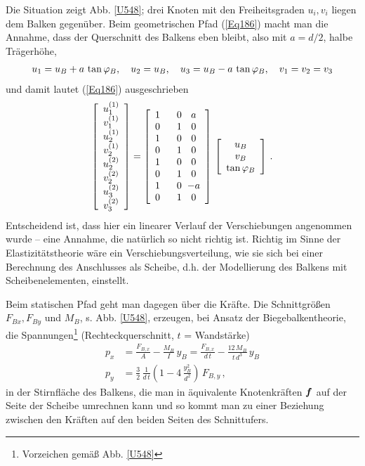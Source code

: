 Die Situation zeigt Abb. \ref{U548}; drei Knoten mit den Freiheitsgraden  $u_i, v_i$ liegen dem Balken gegen\"{u}ber. Beim geometrischen Pfad (\ref{Eq186}) macht man die Annahme, dass der Querschnitt des Balkens eben bleibt, also mit $a = d/2$, halbe Tr\"{a}gerh\"{o}he,
\begin{align}
u_1 = u_B + a\,\tan \varphi_B, \quad u_2 = u_B, \quad u_3 = u_B - a\,\tan \varphi_B, \quad v_1 = v_2 = v_3
\end{align}
und damit lautet (\ref{Eq186}) ausgeschrieben
\begin{align}
\left[\barr{c} u_1^{(1)} \\ v_1^{(1)}  \\u_2^{(1)} \\ v_2^{(1)} \\ u_2^{(2)} \\ v_2^{(2)} \\ u_3^{(2) } \\ v_3^{(2)}\earr \right] = \left[\barr{c @{\hspace{6mm}} c @{\hspace{2mm}} c} 1 &0 & a \\ 0 & 1 & 0 \\ 1 & 0 & 0 \\ 0 & 1 & 0  \\ 1 & 0 & 0 \\ 0 &1 & 0 \\ 1 & 0 &- a \\ 0 & 1 & 0 \earr \right] \,\left[\barr{c} u_B \\ v_B \\ \tan \Np_B \earr \right]\,.
\end{align}
Entscheidend ist, dass hier ein linearer Verlauf der Verschiebungen angenommen wurde -- eine Annahme, die nat\"{u}rlich so nicht richtig ist. Richtig im Sinne der Elastizit\"{a}tstheorie w\"{a}re ein  Verschiebungsverteilung, wie sie sich bei einer Berechnung des Anschlusses als Scheibe, d.h. der Modellierung des Balkens mit Scheibenelementen, einstellt.

Beim statischen Pfad  geht man dagegen \"{u}ber die Kr\"{a}fte. Die Schnittgr\"{o}{\ss}en $F_{Bx}, F_{By}$ und $M_B$, s. Abb. \ref{U548}, erzeugen, bei Ansatz der Biegebalkentheorie, die Spannungen\footnote{Vorzeichen gem\"{a}{\ss} Abb. \ref{U548}} (Rechteckquerschnitt, $t$ = Wandst\"{a}rke)
\begin{align}
p_x &= \frac{F_{B,x}}{A} - \frac{M_B}{I}\,y_B = \frac{F_{B,x}}{d\,t} - \frac{12\,M_B}{t\,d^3}\,y_B \\
p_y &= \frac{3}{2}\,\frac{1}{d\,t} (1 - 4\,\frac{y_B^2}{d^2})\,F_{B,y}\,,
\end{align}
in der Stirnfl\"{a}che des Balkens, die man in \"{a}quivalente Knotenkr\"{a}ften $\mbox{\boldmath $f$}$ auf der Seite der Scheibe umrechnen kann und so kommt man zu einer Beziehung zwischen den Kr\"{a}ften auf den beiden Seiten des Schnittufers.

